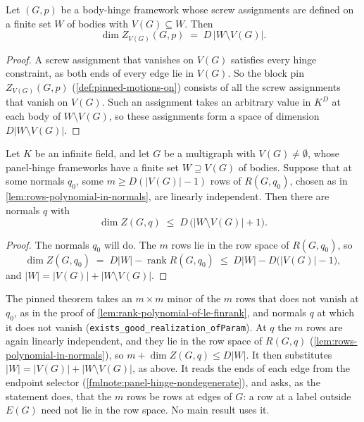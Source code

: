 \begin{lemma}
  \label{lem:relative-screw-split}
  \leanok
  Let $(G,p)$ be a body-hinge framework whose screw assignments are
  defined on a finite set $W$ of bodies with $V(G) \subseteq W$. Then
  \[
    \dim Z_{V(G)}(G,p) \;=\; D\,|W \setminus V(G)|.
  \]
\end{lemma}
\begin{proof}
  \leanok
  A screw assignment that vanishes on $V(G)$ satisfies every hinge
  constraint, as both ends of every edge lie in $V(G)$. So the block pin
  $Z_{V(G)}(G,p)$ (\cref{def:pinned-motions-on}) consists of all the
  screw assignments that vanish on $V(G)$. Such an assignment takes an
  arbitrary value in $K^D$ at each body of $W \setminus V(G)$, so these
  assignments form a space of dimension $D|W \setminus V(G)|$.
\end{proof}

\begin{lemma}
  \label{lem:relative-device-count}
  \leanok
  Let $K$ be an infinite field, and let $G$ be a multigraph with
  $V(G) \neq \emptyset$, whose panel-hinge frameworks have a finite set
  $W \supseteq V(G)$ of bodies. Suppose that at some normals $q_0$, some
  $m \ge D(|V(G)| - 1)$ rows of $R(G,q_0)$, chosen as in
  \cref{lem:rows-polynomial-in-normals}, are linearly independent. Then
  there are normals $q$ with
  \[
    \dim Z(G,q) \;\le\; D\,\bigl(|W \setminus V(G)| + 1\bigr).
  \]
\end{lemma}
\begin{proof}
  \leanok
  The normals $q_0$ will do. The $m$ rows lie in the row space of
  $R(G,q_0)$, so
  \[
    \dim Z(G,q_0) \;=\; D|W| - \operatorname{rank} R(G,q_0) \;\le\;
    D|W| - D\bigl(|V(G)| - 1\bigr),
  \]
  and $|W| = |V(G)| + |W \setminus V(G)|$.
\end{proof}

\begin{fmlnote}
  The pinned theorem takes an $m \times m$ minor of the $m$ rows that
  does not vanish at $q_0$, as in the proof of
  \cref{lem:rank-polynomial-of-le-finrank}, and normals $q$ at which it
  does not vanish
  (\texttt{exists\_\allowbreak{}good\_\allowbreak{}realization\_\allowbreak{}ofParam}).
  At $q$ the $m$ rows are again linearly independent, and they lie in
  the row space of $R(G,q)$ (\cref{lem:rows-polynomial-in-normals}), so
  $m + \dim Z(G,q) \le D|W|$. It then
  substitutes $|W| = |V(G)| + |W \setminus V(G)|$, as above. It reads
  the ends of each edge from the endpoint selector
  (\cref{fmlnote:panel-hinge-nondegenerate}), and asks, as the statement
  does, that the $m$ rows be rows at edges of $G$: a row at a label
  outside $E(G)$ need not lie in the row space. No main result uses it.
\end{fmlnote}

